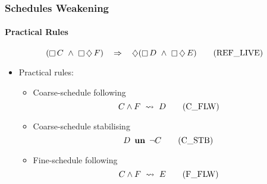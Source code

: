 \begin{frame}
  \frametitle{Schedules Weakening}
  \framesubtitle{Practical Rules}

  
  \begin{equation}
    (\mathop{\square} C ~\land~ \mathop{\square}
    \mathop{\diamondsuit} F) ~~~\mathbin\Rightarrow~~~ \mathop{\diamondsuit} (\mathop{\square} D ~\land~
    \mathop{\square} \mathop{\diamondsuit} E)\label{eq:ref-live}
    \tag{REF\_LIVE}
  \end{equation}
  \begin{itemize}
  \item<2-> \alert{Practical} rules:
    \medskip
    \begin{itemize}
    \item Coarse-schedule following
      \begin{equation}
        \label{eq:csched-weakening}
        C \land F ~\leadsto~ D
        \tag{C\_FLW}
      \end{equation}
    \item Coarse-schedule stabilising
      \begin{equation}
        \label{eq:csched-stable}
        D ~\mathop{\textbf{un}}~ \neg C
        \tag{C\_STB}
      \end{equation}
    \item Fine-schedule following
      \begin{equation}
        \label{eq:fsched-weakening}
        C \land F ~\leadsto~ E
        \tag{F\_FLW}
      \end{equation}
    \end{itemize}
  \end{itemize}
\end{frame}


  
